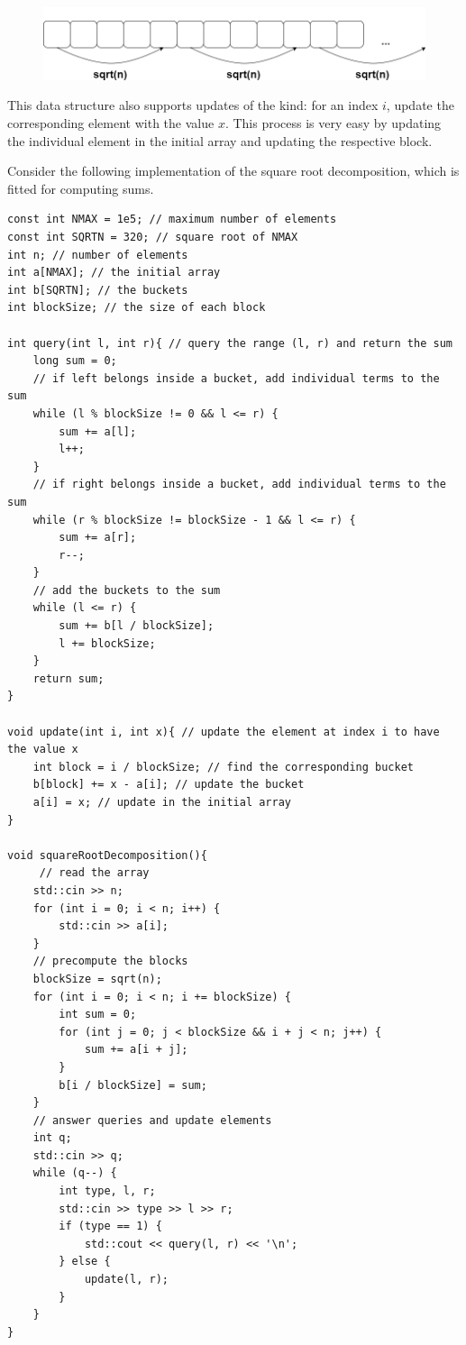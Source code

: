 \documentclass[letterpaper]{article}
\begin{document}
\begin{figure} [h!]
\centering
\includegraphics[width=1\textwidth]{pngOfDiagrams/sqrtdecomposition5.png}
\end{figure}

This data structure also supports updates of the kind: for an index $i$, update the corresponding element with the value $x$. This process is very easy by updating the individual element in the initial array and updating the respective block.

Consider the following implementation of the square root decomposition, which is fitted for computing sums.

\begin{lstlisting}
const int NMAX = 1e5; // maximum number of elements
const int SQRTN = 320; // square root of NMAX
int n; // number of elements
int a[NMAX]; // the initial array
int b[SQRTN]; // the buckets
int blockSize; // the size of each block

int query(int l, int r){ // query the range (l, r) and return the sum
    long sum = 0;
    // if left belongs inside a bucket, add individual terms to the sum
    while (l % blockSize != 0 && l <= r) {
        sum += a[l];
        l++;
    }
    // if right belongs inside a bucket, add individual terms to the sum
    while (r % blockSize != blockSize - 1 && l <= r) {
        sum += a[r];
        r--;
    }
    // add the buckets to the sum
    while (l <= r) {
        sum += b[l / blockSize];
        l += blockSize;
    }
    return sum;
}

void update(int i, int x){ // update the element at index i to have the value x
    int block = i / blockSize; // find the corresponding bucket
    b[block] += x - a[i]; // update the bucket
    a[i] = x; // update in the initial array
}

void squareRootDecomposition(){
     // read the array
    std::cin >> n;
    for (int i = 0; i < n; i++) {
        std::cin >> a[i];
    }
    // precompute the blocks
    blockSize = sqrt(n);
    for (int i = 0; i < n; i += blockSize) {
        int sum = 0;
        for (int j = 0; j < blockSize && i + j < n; j++) {
            sum += a[i + j];
        }
        b[i / blockSize] = sum;
    }
    // answer queries and update elements
    int q;
    std::cin >> q;
    while (q--) {
        int type, l, r;
        std::cin >> type >> l >> r;
        if (type == 1) {
            std::cout << query(l, r) << '\n';
        } else {
            update(l, r);
        }
    }
}
\end{lstlisting}
\end{document}
